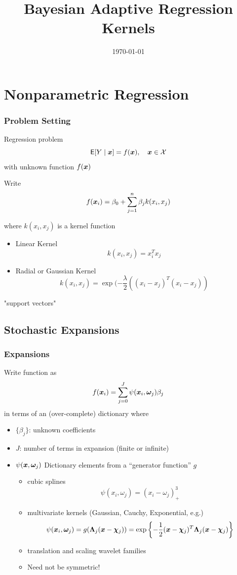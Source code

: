 \documentclass[]{beamer}
\title{Bayesian Adaptive Regression Kernels}
\date{\today}
\newcommand{\bs}[2]{\begin{frame} \frametitle{#1}
{#2}
\end{frame} }
\begin{document}

\begin{frame}
  \titlepage
\end{frame}




\section{Nonparametric Regression}


\bs{Problem Setting}{
Regression problem
$$ {\sf{E}}[Y \mid \bm x] = f(\bm x), \quad \bm x \in \mathcal{X}$$
with unknown function $f(\bm x)$ \pause

Write
$$f(\bm x_i) = \beta_0 + \sum_{j = 1}^n \beta_j k(x_i, x_j)
$$

where  $k(x_i, x_j)$ is a kernel function

\begin{itemize}
  \item Linear Kernel  $$ k(x_i, x_j) = x_i^Tx_j$$
  \item Radial or Gaussian Kernel $$k(x_i, x_j) = \exp(- \frac{\lambda}{2}( (x_i - x_j)^T (x_i - x_j))$$

\end{itemize}

"support vectors"




}

\subsection{Stochastic Expansions}
\bs{Expansions} {

Write function as
 $$f(\bm x_i) = \sum_{j=0}^{J}  \psi(\bm x_i, \bm \omega_j)\beta_j$$ in
terms of an (over-complete) dictionary where \pause

  \begin{itemize}
   \item  $\{\beta_j\}$:  unknown coefficients \pause
   \item  $J$: number of terms in expansion (finite or infinite) \pause


 \item $\psi(\bm x,\bm \omega_j)$   Dictionary elements from
a ``generator function'' $g$ \pause
  \begin{itemize}
  \item cubic splines
$$   \psi(x_i, \omega_j) =  (x_i - \omega_j)^3_+$$ \pause
  \item multivariate kernels  (Gaussian, Cauchy, Exponential, e.g.)
$$  \psi(\bm x_i, \bm \omega_j) =  g(
\bm \Lambda_j (\bm x - \bm \chi_j)) = \exp\left\{-\frac{1}{2}(\bm x - \bm \chi_j)^T \bm \Lambda_j (\bm x -
  \bm \chi_j)\right\}$$  \pause
  \item translation and scaling wavelet families  \pause

\item Need not be symmetric!
  \end{itemize}
  \end{itemize}


}
\end{document}
